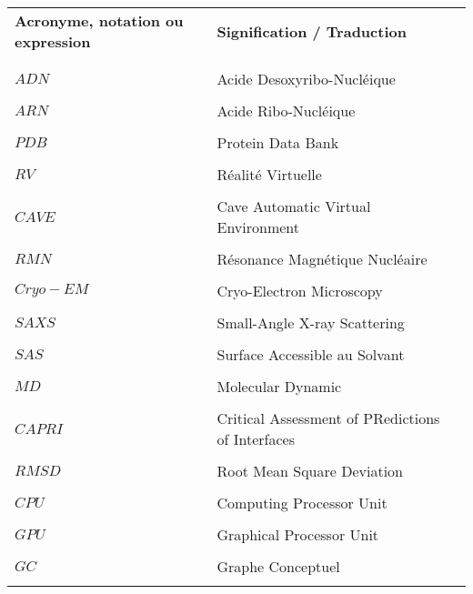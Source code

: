


\begin{table}[htbp]
\centering
\begin{tabular}{l l l}

\textbf{Acronyme, notation ou expression} & \textbf{Signification / Traduction} & \\ \\ %
\hline
\\
$ADN$ & Acide Desoxyribo-Nucléique & \\  \\
$ARN$ & Acide Ribo-Nucléique & \\  \\
$PDB$ & Protein Data Bank & \\  \\
$RV$ & Réalité Virtuelle & \\  \\
$CAVE$ & Cave Automatic Virtual Environment & \\  \\
$RMN$ & Résonance Magnétique Nucléaire & \\  \\
$Cryo-EM$ & Cryo-Electron Microscopy & \\  \\
$SAXS$ & Small-Angle X-ray Scattering & \\  \\
$SAS$ & Surface Accessible au Solvant & \\  \\
$MD$ & Molecular Dynamic & \\  \\
$CAPRI$ & Critical Assessment of PRedictions of Interfaces & \\  \\
$RMSD$ & Root Mean Square Deviation & \\  \\
$CPU$ & Computing Processor Unit & \\  \\
$GPU$ & Graphical Processor Unit & \\  \\
$GC$ & Graphe Conceptuel & \\  \\

\end{tabular}
\end{table}


